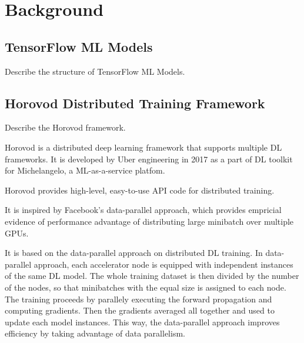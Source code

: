 \section{Background}\label{sec:background}
\subsection{TensorFlow ML Models}
Describe the structure of TensorFlow ML Models.

\subsection{Horovod Distributed Training Framework}
Describe the Horovod framework.

Horovod \cite{sergeev2018horovod} is a distributed deep learning framework
that supports multiple DL frameworks. It is developed by Uber engineering in
2017 as a part of DL toolkit for Michelangelo, a ML-as-a-service platfom. 

Horovod provides high-level, easy-to-use API code for distributed training.

It is inspired by Facebook's data-parallel approach\cite{facebook2018},
which provides empricial evidence of performance advantage of distributing
large minibatch over multiple GPUs.

It is based on the data-parallel approach on distributed DL training.
In data-parallel approach, each accelerator node is equipped with independent
instances of the same DL model. The whole training dataset is then divided by
the number of the nodes, so that minibatches with the equal size is assigned
to each node. The training proceeds by parallely executing the forward
propagation and computing gradients. Then the gradients averaged all together
and used to update each model instances. This way, the data-parallel approach
improves efficiency by taking advantage of data parallelism.
